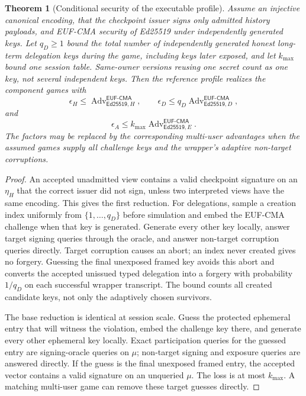 \documentclass[11pt]{article}
\newtheorem{theorem}{Theorem}[section]
\theoremstyle{definition}
\begin{document}
\begin{theorem}[Conditional security of the executable profile]\label{thm:ed25519-reference}
Assume an injective canonical encoding, that the checkpoint issuer signs only admitted history payloads, and EUF-CMA security of Ed25519 under independently generated keys.  Let $q_D\geq1$ bound the total number of independently generated honest long-term delegation keys during the game, including keys later exposed, and let $k_{\max}$ bound one session table.  Same-owner versions reusing one secret count as one key, not several independent keys.  Then the reference profile realizes the component games with
\[
 \epsilon_H\leq \operatorname{Adv}^{\mathsf{EUF\mbox{-}CMA}}_{\mathsf{Ed25519},H},\qquad
 \epsilon_D\leq q_D\operatorname{Adv}^{\mathsf{EUF\mbox{-}CMA}}_{\mathsf{Ed25519},D},
\]
and
\[
 \epsilon_A\leq k_{\max}
 \operatorname{Adv}^{\mathsf{EUF\mbox{-}CMA}}_{\mathsf{Ed25519},E}.
\]
The factors may be replaced by the corresponding multi-user advantages when the assumed games supply all challenge keys and the wrapper's adaptive non-target corruptions.
\end{theorem}
\begin{proof}
An accepted unadmitted view contains a valid checkpoint signature on an $\eta_H$ that the correct issuer did not sign, unless two interpreted views have the same encoding.  This gives the first reduction.  For delegations, sample a creation index uniformly from $\{1,\ldots,q_D\}$ before simulation and embed the EUF-CMA challenge when that key is generated.  Generate every other key locally, answer target signing queries through the oracle, and answer non-target corruption queries directly.  Target corruption causes an abort; an index never created gives no forgery.  Guessing the final unexposed framed key avoids this abort and converts the accepted unissued typed delegation into a forgery with probability $1/q_D$ on each successful wrapper transcript.  The bound counts all created candidate keys, not only the adaptively chosen survivors.

The base reduction is identical at session scale.  Guess the protected ephemeral entry that will witness the violation, embed the challenge key there, and generate every other ephemeral key locally.  Exact participation queries for the guessed entry are signing-oracle queries on $\mu$; non-target signing and exposure queries are answered directly.  If the guess is the final unexposed framed entry, the accepted vector contains a valid signature on an unqueried $\mu$.  The loss is at most $k_{\max}$.  A matching multi-user game can remove these target guesses directly.
\end{proof}
\end{document}
